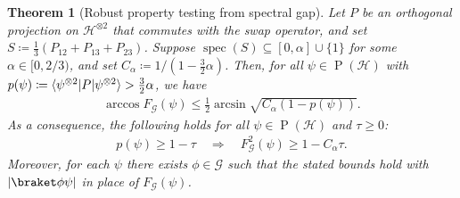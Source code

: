 \documentclass[11pt,a4paper]{article}
\newtheorem{theorem}{Theorem}[section]
\numberwithin{equation}{section}
\newcommand{\ot}{\otimes}
\newcommand{\HH}{\mathcal{H}}
\newcommand{\GG}{\mathcal G}
\newcommand{\1}{\mathbf{1}}
\renewcommand{\P}{\operatorname{P}}
\DeclareMathOperator{\spec}{spec}
\DeclarePairedDelimiter\abs{\lvert}{\rvert}
\DeclarePairedDelimiter\ip{\langle}{\rangle}
\begin{document}
\begin{theorem}[Robust property testing from spectral gap]\label{thm:bound-fidelity-gradient-flow}
Let $P$ be an orthogonal projection on $\HH^{\ot 2}$ that commutes with the swap operator, and set $S \coloneqq \frac13 ( P_{12} + P_{13} + P_{23} )$.
Suppose $\spec(S) \subseteq [0,\alpha] \cup \{1\}$ for some $\alpha\in[0,2/3)$, and set $C_\alpha \coloneqq 1/(1 - \tfrac32\alpha)$.
Then, for all $\psi\in\P(\HH)$ with~$p(\psi) \coloneqq \ip{\psi^{\ot2} | P | \psi^{\ot 2}} > \tfrac32\alpha$, we have
\begin{align*}
    \arccos F_\GG(\psi) \leq \frac12 \arcsin\sqrt{C_\alpha \left( 1-p(\psi) \right)}.
\end{align*}
As a consequence, the following holds for all $\psi\in\P(\HH)$ and $\tau\geq0$:
\begin{align*}
    p(\psi) \geq 1 - \tau \quad\Rightarrow\quad F_\GG^2(\psi) \geq 1 - C_\alpha \tau.
\end{align*}
Moreover, %
for each $\psi$ there exists $\phi\in\GG$ such that the stated bounds hold with $\abs{\braket\phi\psi}$ in place of $F_\GG(\psi)$.
\end{theorem}
\end{document}
